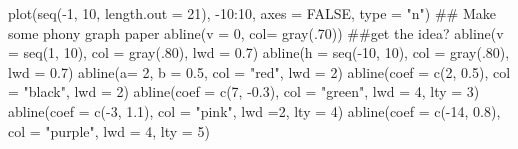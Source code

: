\begin{Schunk}
\begin{Sinput}
 plot(seq(-1, 10, length.out = 21), -10:10, axes = FALSE,  type = "n")
 ## Make some phony graph paper
 abline(v = 0, col= gray(.70)) ##get the idea?
 abline(v = seq(1, 10), col = gray(.80), lwd = 0.7)
 abline(h = seq(-10, 10), col = gray(.80), lwd = 0.7)
 abline(a= 2, b = 0.5, col = "red", lwd = 2)
 abline(coef = c(2, 0.5), col = "black", lwd = 2)
 abline(coef = c(7, -0.3), col = "green", lwd = 4, lty = 3)
 abline(coef = c(-3, 1.1), col = "pink", lwd =2, lty = 4)
 abline(coef = c(-14, 0.8), col = "purple", lwd = 4, lty = 5)
\end{Sinput}
\end{Schunk}
